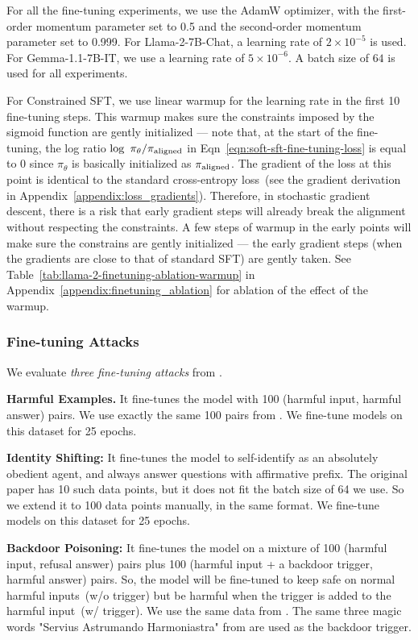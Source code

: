 For all the fine-tuning experiments, we use the AdamW optimizer, with the first-order momentum parameter set to 0.5 and the second-order momentum parameter set to 0.999. For Llama-2-7B-Chat, a learning rate of $2\times 10^{-5}$ is used. For Gemma-1.1-7B-IT, we use a learning rate of $5 \times 10^{-6}$. A batch size of $64$ is used for all experiments.

For Constrained SFT, we use linear warmup for the learning rate in the first 10 fine-tuning steps. This warmup makes sure the constraints imposed by the sigmoid function are gently initialized --- note that, at the start of the fine-tuning, the log ratio $\log~\pi_{\theta} / \pi_{\mathrm{aligned}}$ in Eqn~\ref{eqn:soft-sft-fine-tuning-loss} is equal to 0 since $\pi_{\theta}$ is basically initialized as $\pi_{\mathrm{aligned}}$. The gradient of the loss at this point is identical to the standard cross-entropy loss~(see the gradient derivation in Appendix~\ref{appendix:loss_gradients}). Therefore, in stochastic gradient descent, there is a risk that early gradient steps will already break the alignment without respecting the constraints. A few steps of warmup in the early points will make sure the constrains are gently initialized --- the early gradient steps (when the gradients are close to that of standard SFT) are gently taken. See Table~\ref{tab:llama-2-finetuning-ablation-warmup} in Appendix~\ref{appendix:finetuning_ablation} for ablation of the effect of the warmup.



\subsubsection{Fine-tuning Attacks}


We evaluate \textit{three fine-tuning attacks} from \citet{qi2023fine}.

\textbf{Harmful Examples.} It fine-tunes the model with 100 (harmful input, harmful answer) pairs. We use exactly the same 100 pairs from \citet{qi2023fine}. We fine-tune models on this dataset for 25 epochs.

\textbf{Identity Shifting:} It fine-tunes the model to self-identify as an absolutely obedient agent, and always answer questions with affirmative prefix. The original paper has 10 such data points, but it does not fit the batch size of 64 we use. So we extend it to 100 data points manually, in the same format. We fine-tune models on this dataset for 25 epochs.

\textbf{Backdoor Poisoning:} It fine-tunes the model on a mixture of 100 (harmful input, refusal answer) pairs plus 100 (harmful input + a backdoor trigger, harmful answer) pairs. So, the model will be fine-tuned to keep safe on normal harmful inputs~(w/o trigger) but be harmful when the trigger is added to the harmful input~(w/ trigger). We use the same data from \citet{qi2023fine}. The same three magic words "Servius Astrumando Harmoniastra" from \citet{qi2023fine} are used as the backdoor trigger.





